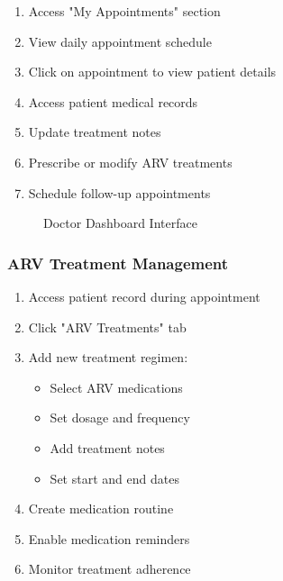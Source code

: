\documentclass[12pt,a4paper]{article}
\begin{document}
\begin{enumerate}
    \item Access "My Appointments" section
    \item View daily appointment schedule
    \item Click on appointment to view patient details
    \item Access patient medical records
    \item Update treatment notes
    \item Prescribe or modify ARV treatments
    \item Schedule follow-up appointments
\end{enumerate}

\begin{figure}[H]
\centering
{}
\caption{Doctor Dashboard Interface}
\end{figure}

\subsubsection{ARV Treatment Management}

\begin{enumerate}
    \item Access patient record during appointment
    \item Click "ARV Treatments" tab
    \item Add new treatment regimen:
    \begin{itemize}
        \item Select ARV medications
        \item Set dosage and frequency
        \item Add treatment notes
        \item Set start and end dates
    \end{itemize}
    \item Create medication routine
    \item Enable medication reminders
    \item Monitor treatment adherence
\end{enumerate}
\end{document}
